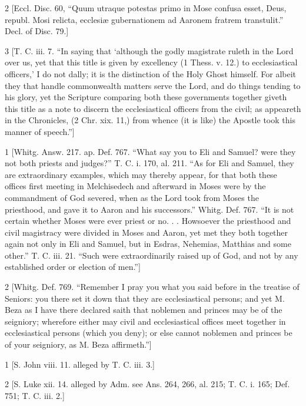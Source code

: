 2
[Eccl. Disc. 60, “Quum utraque potestas primo in Mose confusa esset, Deus, republ. Mosi relicta, ecclesiæ gubernationem ad Aaronem fratrem transtulit.” Decl. of Disc. 79.]

3
[T. C. iii. 7. “In saying that ‘although the godly magistrate ruleth in the Lord over us, yet that this title is given by excellency (1 Thess. v. 12.) to ecclesiastical officers,’ I do not dally; it is the distinction of the Holy Ghost himself. For albeit they that handle commonwealth matters serve the Lord, and do things tending to his glory, yet the Scripture comparing both these governments together giveth this title as a note to discern the ecclesiastical officers from the civil; as appeareth in the Chronicles, (2 Chr. xix. 11,) from whence (it is like) the Apostle took this manner of speech.”]

1
[Whitg. Answ. 217. ap. Def. 767. “What say you to Eli and Samuel? were they not both priests and judges?” T. C. i. 170, al. 211. “As for Eli and Samuel, they are extraordinary examples, which may thereby appear, for that both these offices first meeting in Melchisedech and afterward in Moses were by the commandment of God severed, when as the Lord took from Moses the priesthood, and gave it to Aaron and his successors.” Whitg. Def. 767. “It is not certain whether Moses were ever priest or no. . . Howsoever the priesthood and civil magistracy were divided in Moses and Aaron, yet met they both together again not only in Eli and Samuel, but in Esdras, Nehemias, Matthias and some other.” T. C. iii. 21. “Such were extraordinarily raised up of God, and not by any established order or election of men.”]

2
[Whitg. Def. 769. “Remember I pray you what you said before in the treatise of Seniors: you there set it down that they are ecclesiastical persons; and yet M. Beza as I have there declared saith that noblemen and princes may be of the seigniory; wherefore either may civil and ecclesiastical offices meet together in ecclesiastical persons (which you deny); or else cannot noblemen and princes be of your seigniory, as M. Beza affirmeth.”]

1
[S. John viii. 11. alleged by T. C. iii. 3.]

2
[S. Luke xii. 14. alleged by Adm. see Ans. 264, 266, al. 215; T. C. i. 165; Def. 751; T. C. iii. 2.]

